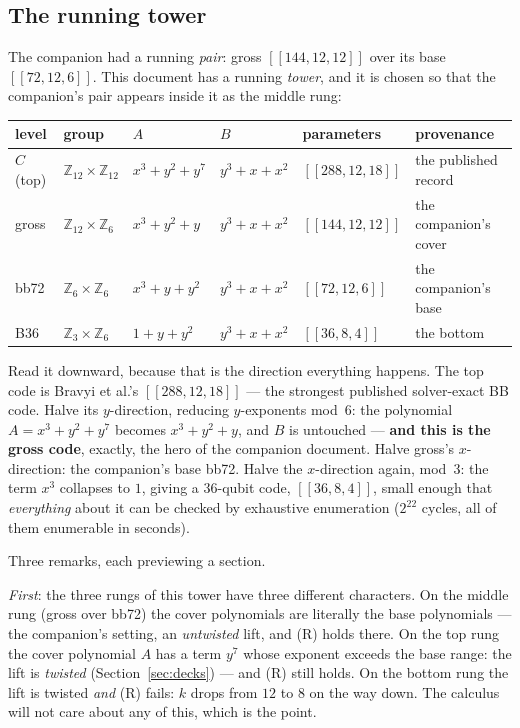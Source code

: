 \documentclass[11pt]{article}
\theoremstyle{plain}
\theoremstyle{definition}
\theoremstyle{remark}
\newcommand{\Z}{\mathbb{Z}}
\begin{document}
\subsection{The running tower}
\label{sec:runningtower}

The companion had a running \emph{pair}: gross $[[144,12,12]]$ over its
base $[[72,12,6]]$. This document has a running \emph{tower}, and it is
chosen so that the companion's pair appears inside it as the middle rung:

\begin{center}
\begin{tabular}{llllll}
\toprule
level & group & $A$ & $B$ & parameters & provenance\\
\midrule
$C$ (top) & $\Z_{12} \times \Z_{12}$ & $x^3 + y^2 + y^7$ & $y^3 + x + x^2$
& $[[288,12,18]]$ & the published record\\
gross & $\Z_{12} \times \Z_6$ & $x^3 + y^2 + y$ & $y^3 + x + x^2$ &
$[[144,12,12]]$ & the companion's cover\\
bb72 & $\Z_6 \times \Z_6$ & $x^3 + y + y^2$ & $y^3 + x + x^2$ &
$[[72,12,6]]$ & the companion's base\\
B36 & $\Z_3 \times \Z_6$ & $1 + y + y^2$ & $y^3 + x + x^2$ &
$[[36,8,4]]$ & the bottom\\
\bottomrule
\end{tabular}
\end{center}

Read it downward, because that is the direction everything happens. The
top code is Bravyi et al.'s $[[288,12,18]]$ --- the strongest published
solver-exact BB code. Halve its $y$-direction, reducing $y$-exponents
mod~$6$: the polynomial $A = x^3 + y^2 + y^7$ becomes $x^3 + y^2 + y$,
and $B$ is untouched --- \textbf{and this is the gross code}, exactly, the
hero of the companion document. Halve gross's $x$-direction: the
companion's base bb72. Halve the $x$-direction again, mod~$3$: the term
$x^3$ collapses to $1$, giving a $36$-qubit code, $[[36,8,4]]$, small
enough that \emph{everything} about it can be checked by exhaustive
enumeration ($2^{22}$ cycles, all of them enumerable in seconds).

Three remarks, each previewing a section.

\emph{First}: the three rungs of this tower have three different
characters. On the middle rung (gross over bb72) the cover polynomials are
literally the base polynomials --- the companion's setting, an
\emph{untwisted} lift, and (R) holds there. On the top rung the cover
polynomial $A$ has a term $y^7$ whose exponent exceeds the base range: the
lift is \emph{twisted} (Section~\ref{sec:decks}) --- and (R) still holds.
On the bottom rung the lift is twisted \emph{and} (R) fails: $k$ drops
from $12$ to $8$ on the way down. The calculus will not care about any of
this, which is the point.
\end{document}
